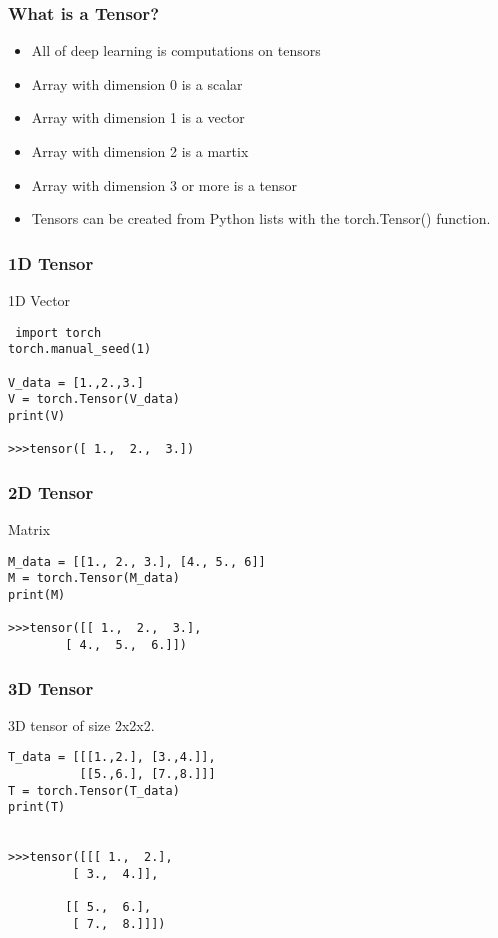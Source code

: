 \begin{frame}[fragile]
\frametitle{What is a Tensor?}
\begin{itemize}
\item All of deep learning is computations on tensors
\item Array with dimension 0 is a scalar
\item Array with dimension 1 is a vector
\item Array with dimension 2 is a martix
\item Array with dimension 3 or more is a tensor
\item Tensors can be created from Python lists with the torch.Tensor() function.
\end{itemize}
 \end{frame} 
 
\begin{frame}[fragile]
\frametitle{1D Tensor}
1D Vector
 \begin{lstlisting}
 import torch
torch.manual_seed(1)

V_data = [1.,2.,3.]
V = torch.Tensor(V_data)
print(V)

>>>tensor([ 1.,  2.,  3.])
 \end{lstlisting}

 \end{frame} 


 
\begin{frame}[fragile]
\frametitle{2D Tensor}
Matrix 
 \begin{lstlisting}
M_data = [[1., 2., 3.], [4., 5., 6]]
M = torch.Tensor(M_data)
print(M)

>>>tensor([[ 1.,  2.,  3.],
        [ 4.,  5.,  6.]])
 \end{lstlisting}

 \end{frame} 

 
\begin{frame}[fragile]
\frametitle{3D Tensor}
3D tensor of size 2x2x2.
 \begin{lstlisting}
T_data = [[[1.,2.], [3.,4.]],
          [[5.,6.], [7.,8.]]]
T = torch.Tensor(T_data)
print(T)


>>>tensor([[[ 1.,  2.],
         [ 3.,  4.]],

        [[ 5.,  6.],
         [ 7.,  8.]]])
 \end{lstlisting}

 \end{frame} 

